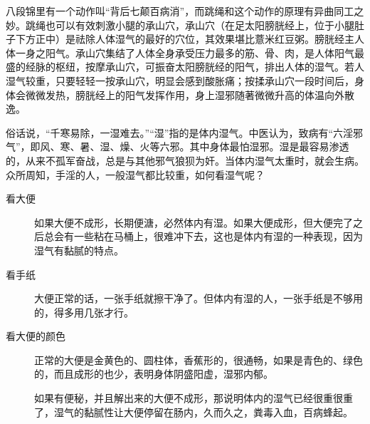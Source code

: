 \begin{description}
    八段锦里有一个动作叫“背后七颠百病消”，而跳绳和这个动作的原理有异曲同工之妙。跳绳也可以有效刺激小腿的承山穴，承山穴（在足太阳膀胱经上，位于小腿肚子下方正中）是祛除人体湿气的最好的穴位，其效果堪比薏米红豆粥。膀胱经主人体一身之阳气。承山穴集结了人体全身承受压力最多的筋、骨、肉，是人体阳气最盛的经脉的枢纽，按摩承山穴，可振奋太阳膀胱经的阳气，排出人体的湿气。若人湿气较重，只要轻轻一按承山穴，明显会感到酸胀痛；按揉承山穴一段时间后，身体会微微发热，膀胱经上的阳气发挥作用，身上湿邪随著微微升高的体温向外散逸。

    俗话说，“千寒易除，一湿难去。”“湿”指的是体内湿气。中医认为，致病有“六淫邪气”，即风、寒、暑、湿、燥、火等六邪。其中身体最怕湿邪。湿是最容易渗透的，从来不孤军奋战，总是与其他邪气狼狈为奸。当体内湿气太重时，就会生病。众所周知，手淫的人，一般湿气都比较重，如何看湿气呢？

    \begin{description}
        \item[看大便] 如果大便不成形，长期便溏，必然体内有湿。如果大便成形，但大便完了之后总会有一些粘在马桶上，很难冲下去，这也是体内有湿的一种表现，因为湿气有黏腻的特点。
        \item[看手纸] 大便正常的话，一张手纸就擦干净了。但体内有湿的人，一张手纸是不够用的，得多用几张才行。
        \item[看大便的颜色] 正常的大便是金黄色的、圆柱体，香蕉形的，很通畅，如果是青色的、绿色的，而且成形的也少，表明身体阴盛阳虚，湿邪内郁。
        \item[] 如果有便秘，并且解出来的大便不成形，那说明体内的湿气已经很重很重了，湿气的黏腻性让大便停留在肠内，久而久之，粪毒入血，百病蜂起。
    \end{description}


\end{description}
